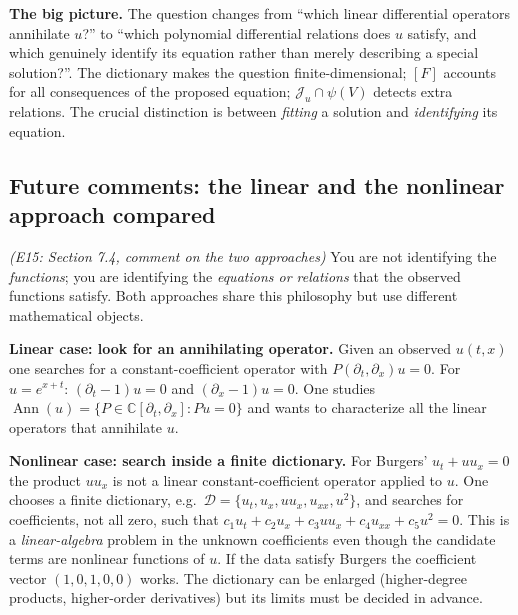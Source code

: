 \documentclass[11pt]{article}
\theoremstyle{plain}
\theoremstyle{definition}
\theoremstyle{remark}
\newcommand{\C}{\mathbb{C}}
\DeclareMathOperator{\Ann}{Ann}             %
\begin{document}
\medskip\textbf{The big picture.} The question changes from ``which linear differential operators annihilate $u$?'' to ``which polynomial differential relations does $u$ satisfy, and which genuinely identify its equation rather than merely describing a special solution?''. The dictionary makes the question finite-dimensional; $[F]$ accounts for all consequences of the proposed equation; $\mathcal J_u\cap\psi(V)$ detects extra relations. The crucial distinction is between \emph{fitting} a solution and \emph{identifying} its equation.

\subsection{Future comments: the linear and the nonlinear approach compared}\label{expl:E15}
\noindent\emph{(E15: Section 7.4, comment on the two approaches)}
You are not identifying the \emph{functions}; you are identifying the \emph{equations or relations} that the observed functions satisfy. Both approaches share this philosophy but use different mathematical objects.

\medskip\textbf{Linear case: look for an annihilating operator.} Given an observed $u(t,x)$ one searches for a constant-coefficient operator with $P(\partial_t,\partial_x)u=0$. For $u=e^{x+t}$: $(\partial_t-1)u=0$ and $(\partial_x-1)u=0$. One studies $\Ann(u)=\{P\in\C[\partial_t,\partial_x]:Pu=0\}$ and wants to characterize all the linear operators that annihilate $u$.

\medskip\textbf{Nonlinear case: search inside a finite dictionary.} For Burgers' $u_t+uu_x=0$ the product $uu_x$ is not a linear constant-coefficient operator applied to $u$. One chooses a finite dictionary, e.g.\ $\mathcal D=\{u_t,u_x,uu_x,u_{xx},u^2\}$, and searches for coefficients, not all zero, such that $c_1u_t+c_2u_x+c_3uu_x+c_4u_{xx}+c_5u^2=0$. This is a \emph{linear-algebra} problem in the unknown coefficients even though the candidate terms are nonlinear functions of $u$. If the data satisfy Burgers the coefficient vector $(1,0,1,0,0)$ works. The dictionary can be enlarged (higher-degree products, higher-order derivatives) but its limits must be decided in advance.
\end{document}

